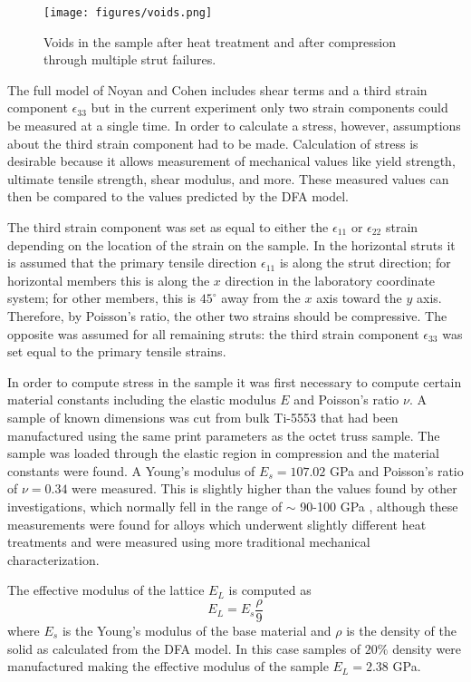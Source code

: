 \begin{figure*}[t]
	\texttt{[image: figures/voids.png]}
	\caption{Voids in the sample after heat treatment and after compression through multiple strut failures.}
	\label{voids}
\end{figure*}

The full model of Noyan and Cohen includes shear terms and a third strain component $\epsilon_{33}$ but in the current experiment only two strain components could be measured at a single time. In order to calculate a stress, however, assumptions about the third strain component had to be made. Calculation of stress is desirable because it allows measurement of mechanical values like yield strength, ultimate tensile strength, shear modulus, and more. These measured values can then be compared to the values predicted by the DFA model.

The third strain component was set as equal to either the $\epsilon_{11}$ or $\epsilon_{22}$ strain depending on the location of the strain on the sample. In the horizontal struts it is assumed that the primary tensile direction $\epsilon_{11}$ is along the strut direction; for horizontal members this is along the $x$ direction in the laboratory coordinate system; for other members, this is $45^\circ$ away from the $x$ axis toward the $y$ axis. Therefore, by Poisson's ratio, the other two strains should be compressive. The opposite was assumed for all remaining struts: the third strain component $\epsilon_{33}$ was set equal to the primary tensile strains.

In order to compute stress in the sample it was first necessary to compute certain material constants including the elastic modulus $E$ and Poisson's ratio $\nu$. A sample of known dimensions was cut from bulk Ti-5553 that had been manufactured using the same print parameters as the octet truss sample. The sample was loaded through the elastic region in compression and the material constants were found. A Young's modulus of $E_s = 107.02$ GPa and Poisson's ratio of $\nu = 0.34$ were measured. This is slightly higher than the values found by other investigations, which normally fell in the range of $\sim$ 90-100 GPa \cite{Clement2010}, although these measurements were found for alloys which underwent slightly different heat treatments and were measured using more traditional mechanical characterization.

The effective modulus of the lattice $E_L$ is computed as
\begin{equation}
	E_L = E_s \frac{\rho}{9}
	\label{effmod}
\end{equation}
where $E_s$ is the Young's modulus of the base material and $\rho$ is the density of the solid as calculated from the DFA model. In this case samples of $20\%$ density were manufactured making the effective modulus of the sample $E_L = 2.38$ GPa.

